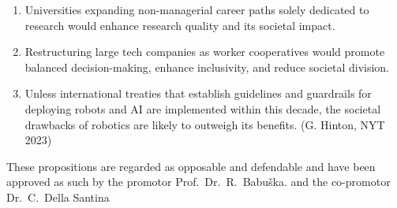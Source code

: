 \documentclass{propositions}
\begin{document}
\begin{enumerate}
    \item Universities expanding non-managerial career paths solely dedicated to research would enhance research quality and its societal impact.
    \item %
    Restructuring large tech companies as worker cooperatives would promote balanced decision-making, enhance inclusivity, and reduce societal division.
    \item %
    Unless international treaties that establish guidelines and guardrails for deploying robots and AI are implemented within this decade, the societal drawbacks of robotics are likely to outweigh its benefits. (G. Hinton, NYT 2023)
\end{enumerate}

\bigskip

\begin{center}
These propositions are regarded as opposable and defendable and have been approved as such by the
promotor Prof.\ Dr.\ R.\ Babu\v{s}ka.
and the co-promotor Dr.\ C.\ Della Santina
\end{center}
\end{document}
